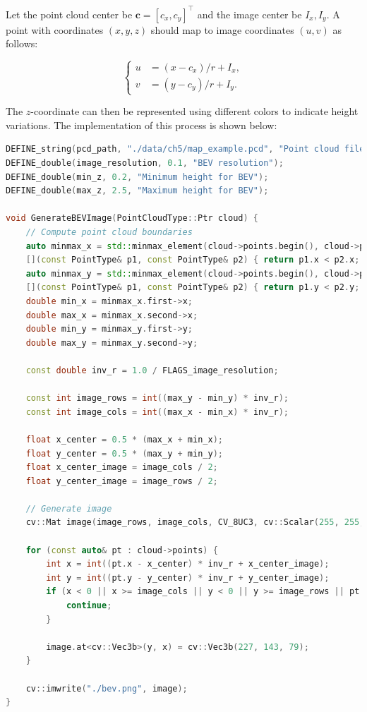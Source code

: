 Let the point cloud center be $\mathbf{c}=[c_x, c_y]^\top$ and the image center be $I_x, I_y$. A point with coordinates $(x, y, z)$ should map to image coordinates $(u, v)$ as follows:  

\begin{equation}\label{key}  
	\left\{  
	\begin{array}{ll}  
		u &= (x-c_x)/r + I_x, \\  
		v &= (y-c_y)/r + I_y.  
	\end{array}\right.  
\end{equation}  

The $z$-coordinate can then be represented using different colors to indicate height variations. The implementation of this process is shown below:  

\begin{lstlisting}[language=c++,caption=src/ch5/pcd\_to\_bird\_eye.cc]  
DEFINE_string(pcd_path, "./data/ch5/map_example.pcd", "Point cloud file path");  
DEFINE_double(image_resolution, 0.1, "BEV resolution");  
DEFINE_double(min_z, 0.2, "Minimum height for BEV");  
DEFINE_double(max_z, 2.5, "Maximum height for BEV");  

void GenerateBEVImage(PointCloudType::Ptr cloud) {  
	// Compute point cloud boundaries  
	auto minmax_x = std::minmax_element(cloud->points.begin(), cloud->points.end(),  
	[](const PointType& p1, const PointType& p2) { return p1.x < p2.x; });  
	auto minmax_y = std::minmax_element(cloud->points.begin(), cloud->points.end(),  
	[](const PointType& p1, const PointType& p2) { return p1.y < p2.y; });  
	double min_x = minmax_x.first->x;  
	double max_x = minmax_x.second->x;  
	double min_y = minmax_y.first->y;  
	double max_y = minmax_y.second->y;  
	
	const double inv_r = 1.0 / FLAGS_image_resolution;  
	
	const int image_rows = int((max_y - min_y) * inv_r);  
	const int image_cols = int((max_x - min_x) * inv_r);  
	
	float x_center = 0.5 * (max_x + min_x);  
	float y_center = 0.5 * (max_y + min_y);  
	float x_center_image = image_cols / 2;  
	float y_center_image = image_rows / 2;  
	
	// Generate image  
	cv::Mat image(image_rows, image_cols, CV_8UC3, cv::Scalar(255, 255, 255));  
	
	for (const auto& pt : cloud->points) {  
		int x = int((pt.x - x_center) * inv_r + x_center_image);  
		int y = int((pt.y - y_center) * inv_r + y_center_image);  
		if (x < 0 || x >= image_cols || y < 0 || y >= image_rows || pt.z < FLAGS_min_z || pt.z > FLAGS_max_z) {  
			continue;  
		}  
		
		image.at<cv::Vec3b>(y, x) = cv::Vec3b(227, 143, 79);  
	}  
	
	cv::imwrite("./bev.png", image);  
}  
\end{lstlisting}  

